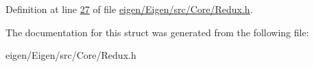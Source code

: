 Definition at line \hyperlink{eigen_2_eigen_2src_2_core_2_redux_8h_source_l00027}{27} of file \hyperlink{eigen_2_eigen_2src_2_core_2_redux_8h_source}{eigen/\+Eigen/src/\+Core/\+Redux.\+h}.



The documentation for this struct was generated from the following file\+:\begin{DoxyCompactItemize}
\item 
eigen/\+Eigen/src/\+Core/\+Redux.\+h\end{DoxyCompactItemize}
